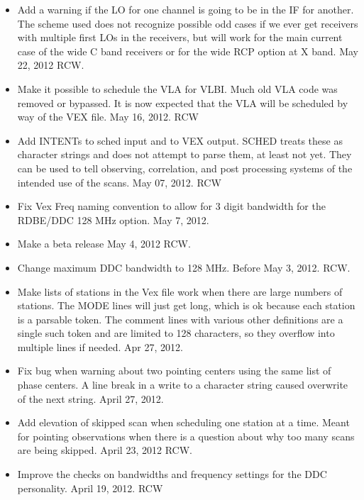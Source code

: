 \documentclass{report}
\begin{document}
\begin{itemize}
\item Add a warning if the LO for one channel is going to be in the
IF for another.  The scheme used does not recognize possible odd cases
if we ever get receivers with multiple first LOs in the receivers,
but will work for the main current case of the wide C band receivers 
or for the wide RCP option at X band.  May 22, 2012  RCW.

\item Make it possible to schedule the VLA for VLBI.  Much old VLA
code was removed or bypassed.  It is now expected that the VLA will be
scheduled by way of the VEX file.  May 16, 2012. RCW

\item Add INTENTs to sched input and to VEX output.  SCHED treats these
as character strings and does not attempt to parse them, at least not 
yet.  They can be used to tell observing, correlation, and post processing
systems of the intended use of the scans.  May 07, 2012.  RCW

\item Fix Vex Freq naming convention to allow for 3 digit bandwidth for
the RDBE/DDC 128 MHz option.  May 7, 2012.

\item Make a beta release May 4, 2012 RCW.

\item Change maximum DDC bandwidth to 128 MHz.  Before May 3, 2012. RCW.

\item Make lists of stations in the Vex file work when there are 
large numbers of stations.  The MODE lines will just get long, which
is ok because each station is a parsable token.  The comment lines
with various other definitions are a single such token and are limited
to 128 characters, so they overflow into multiple lines if needed.
Apr 27, 2012.

\item Fix bug when warning about two pointing centers using the same 
list of phase centers.  A line break in a write to a character string
caused overwrite of the next string.  April 27, 2012.

\item Add elevation of skipped scan when scheduling one station at
a time.  Meant for pointing observations when there is a question
about why too many scans are being skipped.  April 23, 2012  RCW.

\item Improve the checks on bandwidths and frequency settings for the
DDC personality.  April 19, 2012. RCW


\end{itemize}
\end{document}
